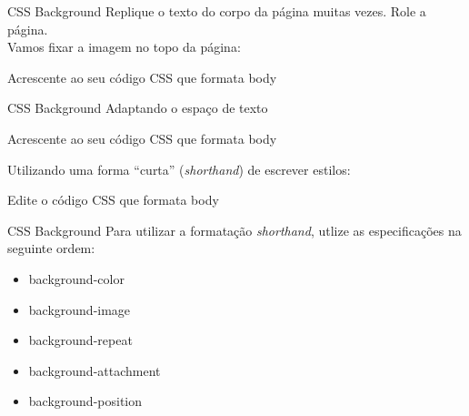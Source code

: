 \documentclass{beamer}
\begin{document}
\begin{frame}{CSS Background}
Replique o texto do corpo da página muitas vezes. Role a página.\\

Vamos fixar a imagem no topo da página:
\begin{center}
	 
	 \tiny Acrescente ao seu código CSS que formata body\\
	\end{center}
\end{frame}
\begin{frame}{CSS Background}
Adaptando o espaço de texto\\
\begin{center}
	 
	 \tiny Acrescente ao seu código CSS que formata body\\
	\end{center}

Utilizando uma forma ``curta'' (\textit{shorthand}) de escrever estilos:
\begin{center}
	 
	 \tiny Edite o código CSS que formata body\\
	\end{center}
\end{frame}
\begin{frame}{CSS Background}
Para utilizar a formatação \textit{shorthand}, utlize as especificações na seguinte ordem:
 \begin{itemize}
  \item background-color
  \item background-image
  \item background-repeat
  \item background-attachment
  \item background-position
 \end{itemize}

\end{frame}
\end{document}

